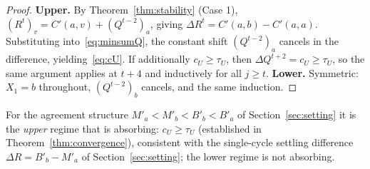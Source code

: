 \begin{proof}
\textbf{Upper.}  By Theorem~\ref{thm:stability} (Case 1), $(R^t)_v = C'(a,v)+(Q^{t-2})_a$, giving $\Delta R^t = C'(a,b)-C'(a,a)$.  Substituting into~\eqref{eq:minsumQ}, the constant shift $(Q^{t-2})_a$ cancels in the difference, yielding~\eqref{eq:cU}.  If additionally $c_U \geq \tau_U$, then $\Delta Q^{t+2} = c_U \geq \tau_U$, so the same argument applies at $t+4$ and inductively for all $j \geq t$.  \textbf{Lower.}  Symmetric: $X_1=b$ throughout, $(Q^{t-2})_b$ cancels, and the same induction. \qedhere
\end{proof}
\noindent For the agreement structure $M'_a < M'_b < B'_b < B'_a$ of Section~\ref{sec:setting} it is the \emph{upper} regime that is absorbing: $c_U \geq \tau_U$ (established in Theorem~\ref{thm:convergence}), consistent with the single-cycle settling difference $\Delta R = B'_b - M'_a$ of Section~\ref{sec:setting}; the lower regime is not absorbing.
